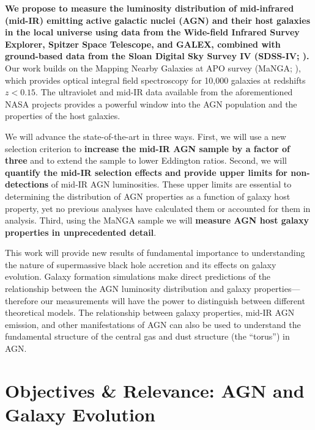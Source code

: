 \documentclass[12pt, preprint]{hacked-aastex}
\begin{document}
{\bf We propose to measure the luminosity distribution of mid-infrared
  (mid-IR) emitting active galactic nuclei (AGN) and their host
  galaxies in the local universe using data from the Wide-field
  Infrared Survey Explorer, Spitzer Space Telescope, and GALEX,
  combined with ground-based data from the Sloan Digital Sky Survey IV
  (SDSS-IV; \cite{blanton17a}).}  Our work builds on the Mapping
Nearby Galaxies at APO survey (MaNGA; \cite{bundy15a}), which provides
optical integral field spectroscopy for 10,000 galaxies at redshifts
$z<0.15$.  The ultraviolet and mid-IR data available from the
aforementioned NASA projects provides a powerful window into the AGN
population and the properties of the host galaxies.

We will advance the state-of-the-art in three ways. First, we will use
a new selection criterion to {\bf increase the mid-IR AGN sample by a
  factor of three} and to extend the sample to lower Eddington
ratios. Second, we will {\bf quantify the mid-IR selection effects and
  provide upper limits for non-detections} of mid-IR AGN
luminosities. These upper limits are essential to determining the
distribution of AGN properties as a function of galaxy host property,
yet no previous analyses have calculated them or accounted for them in
analysis.  Third, using the MaNGA sample we will {\bf measure AGN host
  galaxy properties in unprecedented detail}.

This work will provide new results of fundamental importance to
understanding the nature of supermassive black hole accretion and its
effects on galaxy evolution.  Galaxy formation simulations make direct
predictions of the relationship between the AGN luminosity
distribution and galaxy properties---therefore our measurements will
have the power to distinguish between different theoretical
models. The relationship between galaxy properties, mid-IR AGN
emission, and other manifestations of AGN can also be used to
understand the fundamental structure of the central gas and dust
structure (the ``torus'') in AGN.

\section{Objectives \& Relevance: AGN and Galaxy Evolution}\label{sec:objectives}

\end{document}
